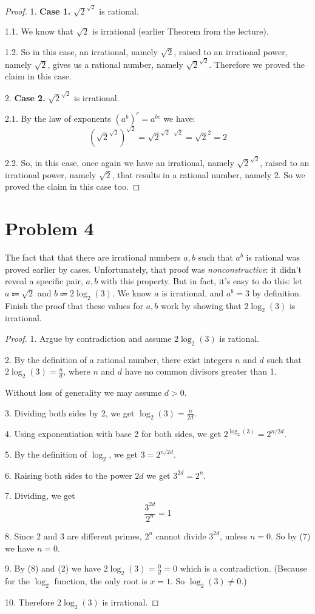 \documentclass[14pt]{extarticle}
\begin{document}
\begin{proof}
1. \textbf{Case 1.} $\sqrt{2}^{\sqrt{2}}$ is rational.

1.1. We know that $\sqrt{2}$ is irrational (earlier Theorem from the lecture). 

1.2. So in this case, an irrational, namely $\sqrt{2}$, raised to an irrational power, namely $\sqrt{2}$, gives us a rational number, namely $\sqrt{2}^{\sqrt{2}}$. Therefore we proved the claim in this case.

2. \textbf{Case 2.} $\sqrt{2}^{\sqrt{2}}$ is irrational.

2.1. By the law of exponents $(a^b)^c = a^{bc}$ we have:
$$
\left(\sqrt{2}^{\sqrt{2}}\right)^{\sqrt{2}} = \sqrt{2}^{\sqrt{2} \cdot \sqrt{2}} = \sqrt{2}^2 = 2
$$

2.2. So, in this case, once again we have an irrational, namely $\sqrt{2}^{\sqrt{2}}$, raised to an irrational power, namely $\sqrt{2}$, that results in a rational number, namely 2. So we proved the claim in this case too.
\end{proof}

\section{Problem 4}

The fact that that there are irrational numbers $a, b$ such that $a^b$ is rational was proved earlier by cases. Unfortunately, that proof was {\it nonconstructive}: it didn’t reveal a specific pair, $a, b$ with this property. But in fact, it’s easy to do this: let $a \Coloneqq \sqrt{2}$ and $b \Coloneqq 2 \log_2(3)$. We know $a$ is irrational, and $a^b = 3$ by definition. Finish the proof that these values for $a, b$ work by showing that $2 \log_2(3)$ is irrational.

\begin{proof}
1. Argue by contradiction and assume $2\log_2(3)$ is rational.

2. By the definition of a rational number, there exist integers $n$ and $d$ such that $2\log_2(3) = \frac{n}{d}$, where $n$ and $d$ have no common divisors greater than 1. 

Without loss of generality we may assume $d > 0$.

3. Dividing both sides by 2, we get $\displaystyle \log_2(3) = \frac{n}{2d}$.

4. Using exponentiation with base 2 for both sides, we get  $2^{\log_2(3)} = 2^{n/2d}$.

5. By the definition of $\log_2$, we get $3 = 2^{n/2d}$.

6. Raising both sides to the power $2d$ we get $3^{2d} = 2^n$.

7. Dividing, we get
$$
\frac{3^{2d}}{2^n} = 1 
$$

8. Since $2$ and $3$ are different primes, $2^n$ cannot divide $3^{2d}$, unless $n = 0$. So by (7) we have $n = 0$.

9. By (8) and (2) we have $2\log_2(3) = \frac{0}{d} = 0$ which is a contradiction. (Because for the $\log_2$ function, the only root is $x = 1$. So $\log_2(3) \neq 0$.)

10. Therefore $2\log_2(3)$ is irrational.
\end{proof}
\end{document}
